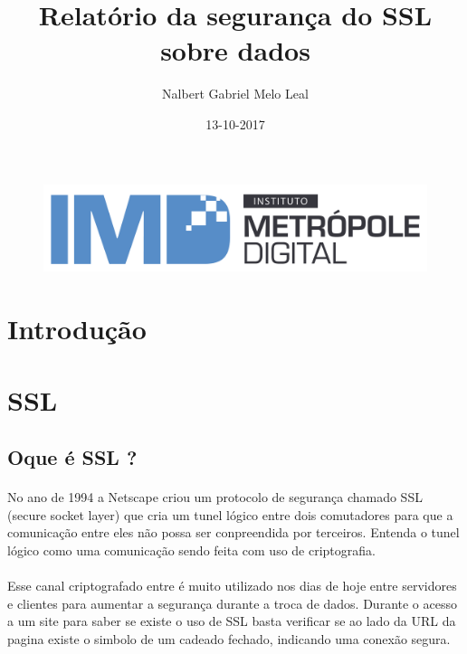 \documentclass{article}
\title{Relatório da segurança do SSL sobre dados}
\author{Nalbert Gabriel Melo Leal}
\date{13-10-2017}
\begin{document}

  \begin{figure}
		\includegraphics[width=\textwidth]{imdLogo.png}
		\label{fig:imdLogo}
	\end{figure}

  \maketitle

  \newpage

  \tableofcontents
  \newpage


  \section{Introdução}

  \newpage

  \section{SSL}
  \subsection{Oque é SSL ?}
  \paragraph{}
  No ano de 1994 a Netscape criou um protocolo de segurança chamado SSL (secure
  socket layer) que cria um tunel lógico entre dois comutadores para que a
  comunicação entre eles não possa ser conpreendida por terceiros. Entenda o
  tunel lógico como uma comunicação sendo feita com uso de criptografia.
  \paragraph{}
    Esse canal criptografado entre é muito utilizado nos dias de hoje entre
  servidores e clientes para aumentar a segurança durante a troca de dados.
  Durante o acesso a um site para saber se existe o uso de SSL basta verificar
  se ao lado da URL da pagina existe o simbolo de um cadeado fechado, indicando
  uma conexão segura.
\end{document}
